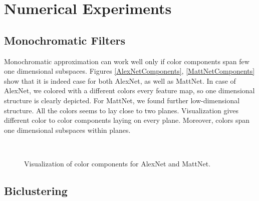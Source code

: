\section{Numerical Experiments}

\subsection{Monochromatic Filters}
Monochromatic approximation can work well only if color components span few one dimensional subspaces. 
Figures \ref{AlexNetComponents}, \ref{MattNetComponents} show that it is indeed case for both AlexNet, as
well as MattNet. In case of AlexNet, we colored with a different colors every feature map, so one dimensional structure
is clearly depicted. For MattNet, we found further low-dimensional structure. All the colors seems to lay close
to two planes. Visualization gives different color to color components laying on every plane. Moreover,
colors span one dimensional subspaces within planes.

\begin{figure}[t]
\mbox{
  \quad
{}
}
\caption{Visualization of color components for AlexNet and MattNet.}
\end{figure}



\subsection{Biclustering}

